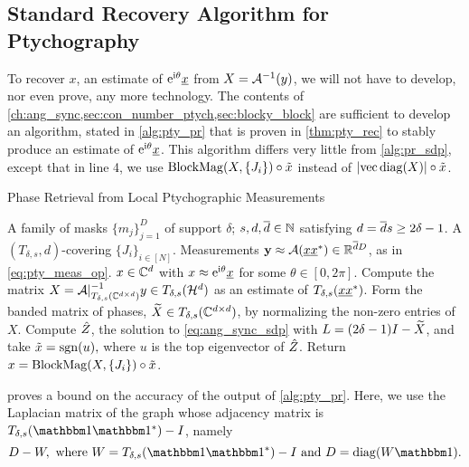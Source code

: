 \subsection{Standard Recovery Algorithm for Ptychography}
\label{sec:pty_std_rec}
To recover $x$, an estimate of $\mathrm{e}^{\mathrm{i} \theta} \underline{x}$ from $X = \mathcal{A}^{-1}(y)$, we will not have to develop, nor even prove, any more technology.  The contents of \cref{ch:ang_sync,sec:con_number_ptych,sec:blocky_block} are sufficient to develop an algorithm, stated in \cref{alg:pty_pr} that is proven in \cref{thm:pty_rec} to stably produce an estimate of $\mathrm{e}^{\mathrm{i} \theta} \underline{x}$.  This algorithm differs very little from \cref{alg:pr_sdp}, except that in line 4, we use $\operatorname{BlockMag}(X, \{J_i\}) \circ \tilde{x}$ instead of $\lvert\operatorname{vec} \operatorname{diag}(X)\rvert \circ \tilde{x}$.

\begin{algorithm}
\renewcommand{\algorithmicrequire}{\textbf{Input:}}
\renewcommand{\algorithmicensure}{\textbf{Output:}}
\caption{Phase Retrieval from Local Ptychographic Measurements}
\label{alg:pty_pr}
\begin{algorithmic}[1]
    \REQUIRE A family of masks $\{m_j\}_{j = 1}^D$ of support $\delta$; $s, d, \overline{d} \in \mathbb{N}$ satisfying $d = \overline{d} s \ge 2 \delta - 1$.  A $(T_{\delta, s}, d)$-covering $\{J_i\}_{i \in [N]}$.  Measurements $\mathbf{y} \approx \mathcal{A}(\underline{x} \underline{x}^*) \in \mathbb{R}^{\overline{d} D}$, as in \eqref{eq:pty_meas_op}.
    \ENSURE $x \in \mathbb{C}^d$ with $x \approx \mathrm{e}^{\mathrm{i} \theta} \underline{x}$ for some $\theta \in [0, 2 \pi]$.
    \STATE Compute the matrix $X = \mathcal{A}|_{T_{\delta, s}(\mathbb{C}^{d \times d})}^{-1} y \in T_{\delta, s}(\mathcal{H}^d)$ as an estimate of $T_{\delta, s}(\underline{x} \underline{x}^*)$.
    \STATE Form the banded matrix of phases, $\widetilde{X} \in T_{\delta, s}(\mathbb{C}^{d \times d})$, by normalizing the non-zero entries of $X$. %
    \STATE Compute $\hat{Z}$, the solution to \eqref{eq:ang_sync_sdp} with $L = (2 \delta - 1) I - \widetilde{X}$, and take $\tilde{x} = \operatorname{sgn}(u),$ where $u$ is the top eigenvector of $\hat{Z}$.
    \STATE Return $x = \operatorname{BlockMag}(X, \{J_i\}) \circ \tilde{x}$.
\end{algorithmic}
\end{algorithm}

 proves a bound on the accuracy of the output of \cref{alg:pty_pr}.  Here, we use the Laplacian matrix of the graph whose adjacency matrix is $T_{\delta, s}(\one \one^*) - I$, namely \begin{equation}D - W, \ \text{where} \ W = T_{\delta, s}(\one \one^*) - I \ \text{and} \ D = \diag(W \one).\label{eq:pty_lap}\end{equation}

